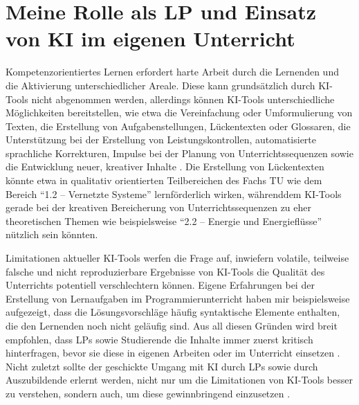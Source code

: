 \section{Meine Rolle als \gls{LP} und Einsatz von \gls{KI} im eigenen Unterricht}
Kompetenzorientiertes Lernen erfordert harte Arbeit durch die Lernenden und die Aktivierung unterschiedlicher Areale. Diese kann grundsätzlich durch \gls{KI}-Tools nicht abgenommen werden, allerdings können \gls{KI}-Tools unterschiedliche Möglichkeiten bereitstellen, wie etwa die Vereinfachung oder Umformulierung von Texten, die Erstellung von Aufgabenstellungen, Lückentexten oder Glossaren, die Unterstützung bei der Erstellung von Leistungskontrollen, automatisierte sprachliche Korrekturen, Impulse bei der Planung von Unterrichtssequenzen sowie die Entwicklung neuer, kreativer Inhalte \cite{bbz}. Die Erstellung von Lückentexten könnte etwa in qualitativ orientierten Teilbereichen des Fachs \gls{TU} wie dem Bereich ``1.2 -- Vernetzte Systeme'' lernförderlich wirken, währenddem \gls{KI}-Tools gerade bei der kreativen Bereicherung von Unterrichtssequenzen zu eher theoretischen Themen wie beispielsweise ``2.2 -- Energie und Energieflüsse'' nützlich sein könnten. 

Limitationen aktueller \gls{KI}-Tools werfen die Frage auf, inwiefern volatile, teilweise falsche und nicht reproduzierbare Ergebnisse von \gls{KI}-Tools die Qualität des Unterrichts potentiell verschlechtern können. Eigene Erfahrungen bei der Erstellung von Lernaufgaben im Programmierunterricht haben mir beispielsweise aufgezeigt, dass die Lösungsvorschläge häufig syntaktische Elemente enthalten, die den Lernenden noch nicht geläufig sind. Aus all diesen Gründen wird breit empfohlen, dass \glspl{LP} sowie Studierende die Inhalte immer zuerst kritisch hinterfragen, bevor sie diese in eigenen Arbeiten oder im Unterricht einsetzen \cite{bbz,bfh}. Nicht zuletzt sollte der geschickte Umgang mit \gls{KI} durch \glspl{LP} sowie durch Auszubildende erlernt werden, nicht nur um die Limitationen von \gls{KI}-Tools besser zu verstehen, sondern auch, um diese gewinnbringend einzusetzen \cite{nzzAS,nzzChatGPT}.

